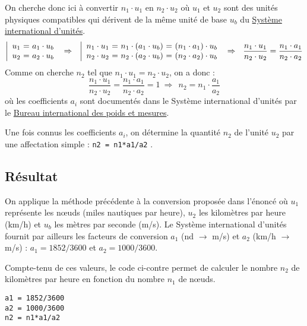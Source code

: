 On cherche donc ici à convertir $n_1\cdot u_1$ en $n_2\cdot u_2$ 
où $u_1$ et $u_2$ sont des unités physiques compatibles 
qui dérivent de la même unité de base $u_b$ du \href{http://www.bipm.org/fr/si/}{Système international d'unités}.
$$\left|\begin{array}{l@{\ =\ }r}
u_1 & a_1\cdot u_b \\
u_2 & a_2\cdot u_b
\end{array}\right.
\ \Rightarrow\ \ 
\left|\begin{array}{l@{\ =\ }r@{\ =\ }r}
n_1\cdot u_1 & n_1\cdot (a_1\cdot u_b) & (n_1\cdot a_1)\cdot u_b\\
n_2\cdot u_2 & n_2\cdot (a_2\cdot u_b) & (n_2\cdot a_2)\cdot u_b
\end{array}\right.
\ \Rightarrow\ \ \frac{n_1\cdot u_1}{n_2\cdot u_2} = \frac{n_1\cdot a_1}{n_2\cdot a_2}$$
Comme on cherche $n_2$ tel que $n_1\cdot u_1 = n_2\cdot u_2$, on a donc :
$$\frac{n_1\cdot u_1}{n_2\cdot u_2} = \frac{n_1\cdot a_1}{n_2\cdot a_2} = 1
\ \Rightarrow\ \ n_2 = n_1 \cdot \frac{a_1}{a_2}$$
où les coefficients $a_i$ sont documentés dans le Système international d'unités par le
\href{http://www.bipm.org/}{Bureau international des poids et mesures}.

Une fois connus les coefficients $a_i$, on détermine la quantité $n_2$ de l'unité $u_2$
par une affectation simple : \texttt{n2 = n1*a1/a2} .

\subsection{Résultat} On applique la méthode précédente à la conversion
proposée dans l'énoncé où $u_1$ représente les n\oe uds (miles nautiques par heure), 
$u_2$ les kilomètres par heure (km/h) et $u_b$ les mètres par seconde (m/s).
Le Système international d'unités fournit par ailleurs les facteurs 
de conversion $a_1$ (nd $\rightarrow$ m/s) et $a_2$ (km/h $\rightarrow$ m/s) :
$a_1 = 1852/3600$ et $a_2 = 1000/3600$.


\noindent\begin{minipage}{7cm}
Compte-tenu de ces valeurs, le code ci-contre
permet de calculer le nombre $n_2$ de kilomètres par heure
en fonction du nombre $n_1$ de n\oe uds.
\end{minipage}
\hfill
\begin{minipage}{8cm}
\begin{lstlisting}[caption=\textbf{conversion d'unités}]
a1 = 1852/3600
a2 = 1000/3600
n2 = n1*a1/a2
\end{lstlisting}
\end{minipage}


